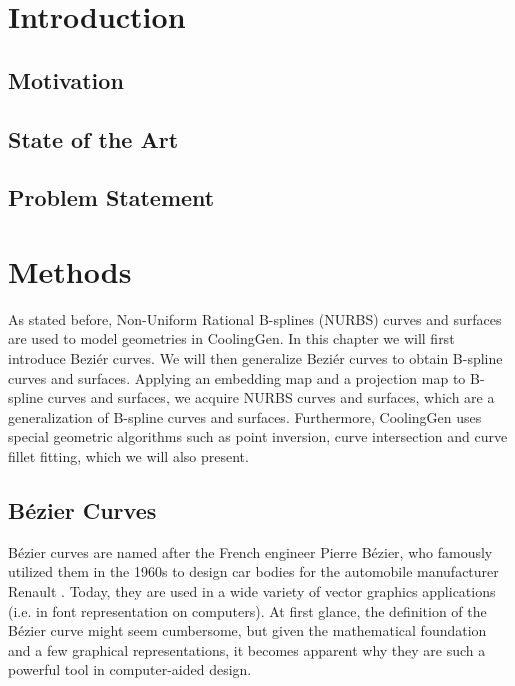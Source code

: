 \documentclass[a4paper, 11pt]{report}
\theoremstyle{definition}
\begin{document}
\restoregeometry
\begin{abstract}
	\thispagestyle{plain}
	\setcounter{page}{3}
	\lipsum[1-3]
\end{abstract}
\renewcommand{\abstractname}{Zusammenfassung}
\begin{abstract}
	\thispagestyle{plain}
	\setcounter{page}{4}
	\lipsum[4-6]
\end{abstract}
\pagebreak

\setcounter{page}{5}
\restoregeometry
\tableofcontents
\pagebreak

\restoregeometry
{}
\setcounter{page}{1}
\pagestyle{plain}

\chapter{Introduction}
\section{Motivation}
\section{State of the Art}
\section{Problem Statement}

\chapter{Methods}
	As stated before, Non-Uniform Rational B-splines (NURBS) curves and surfaces are used to model geometries in CoolingGen. In this chapter we will first introduce Beziér curves. We will then generalize Beziér curves to obtain B-spline curves and surfaces. Applying an embedding map and a projection map to B-spline curves and surfaces, we acquire NURBS curves and surfaces, which are a generalization of B-spline curves and surfaces. Furthermore, CoolingGen uses special geometric algorithms such as point inversion, curve intersection and curve fillet fitting, which we will also present.

\section{Bézier Curves}
	Bézier curves are named after the French engineer Pierre Bézier, who famously utilized them in the 1960s to design car bodies for the automobile manufacturer Renault \cite{Bezier1968}. Today, they are used in a wide variety of vector graphics applications (i.e. in font representation on computers). At first glance, the definition of the Bézier curve might seem cumbersome, but given the mathematical foundation and a few graphical representations, it becomes apparent why they are such a powerful tool in computer-aided design.
\end{document}
